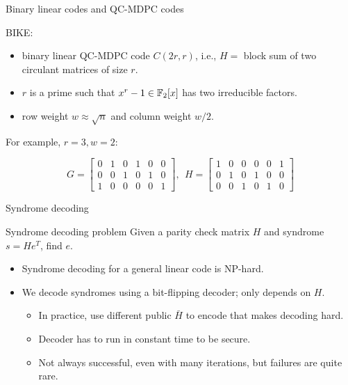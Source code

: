 \begin{frame}{Binary linear codes and QC-MDPC codes}

BIKE:

\begin{itemize}
    \item binary linear QC-MDPC code $C(2r,r)$, i.e., $H = $ block sum of two circulant matrices of size $r$.
    \item $r$ is a prime such that $x^r -1 \in \mathbb{F}_2[x]$ has two irreducible factors.
    \item row weight $w \approx \sqrt{n}$ and column weight $w/2$.
\end{itemize}

For example, $r = 3, w = 2$:

\[
G = \begin{bmatrix}
0 & 1 & 0 & 1 & 0 & 0 \\
0 & 0 & 1 & 0 & 1 & 0 \\
1 & 0 & 0 & 0 & 0 & 1
\end{bmatrix}, \ \ 
H = \begin{bmatrix}
1 & 0 & 0 & 0 & 0 & 1 \\
0 & 1 & 0 & 1 & 0 & 0 \\
0 & 0 & 1 & 0 & 1 & 0
\end{bmatrix}
\]

\end{frame}

\begin{frame}{Syndrome decoding}

\begin{block}{Syndrome decoding problem}
    Given a parity check matrix $H$ and syndrome $s = He^T$, find $e$.
\end{block}

\pause \begin{itemize}
    \item Syndrome decoding for a general linear code is NP-hard.
    \item We decode syndromes using a bit-flipping decoder; only depends on $H$.
    \begin{itemize}
        \item In practice, use different public $\bar{H}$ to encode that makes decoding hard.
        \item Decoder has to run in constant time to be secure.
        \item Not always successful, even with many iterations, but failures are quite rare.
    \end{itemize}
\end{itemize}
    
\end{frame}

